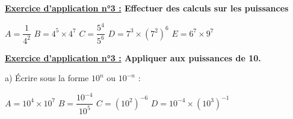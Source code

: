 \documentclass[12pt]{article}
\begin{document}
\begin{mdframed}[
    linewidth=1pt,
    linecolor=RoyalBlue,
    innertopmargin=10pt,
    innerbottommargin=10pt
]
{\color{RoyalBlue}\textbf{\underline{Exercice d'application n°3 :} Effectuer des 
calculs sur les puissances}}

\begin{center}
    $A = \dfrac{1}{4^2}$
    \hspace{1cm}$B = 4^5 \times 4^7$
    \hspace{1cm}$C = \dfrac{5^4}{5^6}$
    \hspace{1cm}$D = 7^3 \times (7^2)^6$
    \hspace{1cm}$E = 6^7 \times 9^7$
\end{center}

\vspace{0.5cm}
\dotfill

\vspace{0.5cm}
\dotfill

\vspace{0.5cm}
\dotfill

\vspace{0.5cm}
\dotfill

\vspace{0.5cm}
\dotfill

\vspace{0.5cm}
\dotfill

\vspace{0.5cm}
\dotfill

\vspace{0.5cm}
\dotfill

\vspace{0.5cm}
\dotfill

\vspace{0.5cm}
\dotfill

\vspace{0.5cm}
\dotfill

\vspace{0.5cm}
\dotfill

\vspace{20pt}

{\color{RoyalBlue}\textbf{\underline{Exercice d'application n°3 :} Appliquer aux 
puissances de 10.}}

\vspace{5pt}
\hspace{1cm}a) Écrire sous la forme $10^n$ ou $10^{-n}$ :

\begin{center}
    $A = 10^4 \times 10^7$
    \hspace{1cm}$B = \dfrac{10^{-4}}{10^5}$
    \hspace{1cm}$C = (10^2)^{-6}$
    \hspace{1cm}$D = 10^{-4} \times (10^3)^{-1}$
\end{center}


\end{mdframed}
\end{document}
